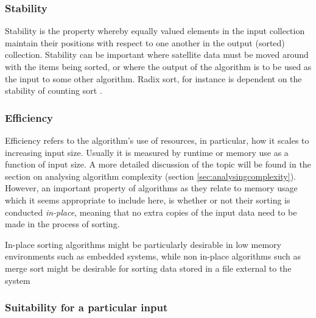 \documentclass[12pt, a4paper]{article}
\begin{document}
\subsubsection{Stability}

Stability is the property whereby equally valued elements in the input collection maintain their positions with respect to one another in the output (sorted) collection. Stability can be important where satellite data must be moved around with the items being sorted, or where the output of the algorithm is to be used as the input to some other algorithm. Radix sort, for instance is dependent on the stability of counting sort \autocite[170]{cormen01}.

\subsubsection{Efficiency}


Efficiency refers to the algorithm's use of resources, in particular, how it scales to increasing input size. Usually it is measured by runtime or memory use as a function of input size. A more detailed discussion of the topic will be found in the section on analysing algorithm complexity (section \ref{sec:analysingcomplexity}). However, an important property of algorithms as they relate to memory usage which it seems appropriate to include here, is whether or not their sorting is conducted \emph{in-place}, meaning that no extra copies of the input data need to be made in the process of sorting. 

In-place sorting algorithms might be particularly desirable in low memory environments such as embedded systems, while non in-place algorithms such as merge sort might be desirable for sorting data stored in a file external to the system \autocite[81]{heineman2016algorithms}


\subsubsection{Suitability for a particular input}
\end{document}

